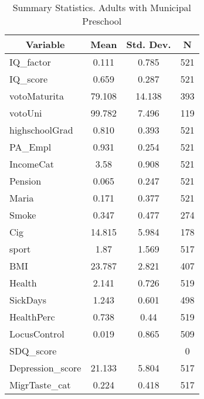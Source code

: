 
\begin{table}[htbp]\centering \caption{Summary Statistics. Adults with Municipal Preschool \label{schoolAdultmaternaMuni}}
\begin{tabular}{l c c  c}\hline\hline
\multicolumn{1}{c}{\textbf{Variable}} & \textbf{Mean}
 & \textbf{Std. Dev.} & \textbf{N}\\ \hline
IQ\_factor & 0.111 & 0.785  & 521\\
IQ\_score & 0.659 & 0.287  & 521\\
votoMaturita & 79.108 & 14.138  & 393\\
votoUni & 99.782 & 7.496  & 119\\
highschoolGrad & 0.810 & 0.393  & 521\\
PA\_Empl & 0.931 & 0.254  & 521\\
IncomeCat & 3.58 & 0.908  & 521\\
Pension & 0.065 & 0.247  & 521\\
Maria & 0.171 & 0.377  & 521\\
Smoke & 0.347 & 0.477  & 274\\
Cig & 14.815 & 5.984  & 178\\
sport & 1.87 & 1.569  & 517\\
BMI & 23.787 & 2.821  & 407\\
Health & 2.141 & 0.726  & 519\\
SickDays & 1.243 & 0.601  & 498\\
HealthPerc & 0.738 & 0.44  & 519\\
LocusControl & 0.019 & 0.865  & 509\\
SDQ\_score &  &   & 0\\
Depression\_score & 21.133 & 5.804  & 517\\
MigrTaste\_cat & 0.224 & 0.418  & 517\\
\hline\end{tabular}
\end{table}
